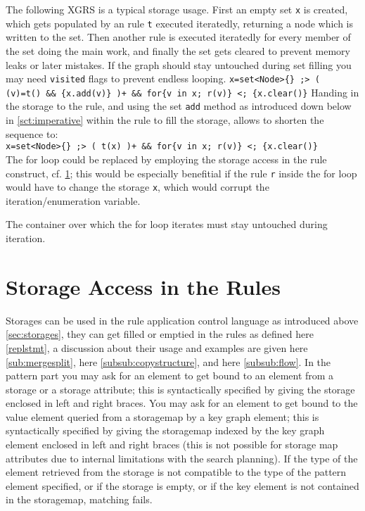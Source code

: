 \begin{example}
The following XGRS is a typical storage usage.
First an empty set \texttt{x} is created, which gets populated by an rule \texttt{t} executed iteratedly, returning a node which is written to the set.
Then another rule is executed iteratedly for every member of the set doing the main work, and finally the set gets cleared to prevent memory leaks or later mistakes.
If the graph should stay untouched during set filling you may need \texttt{visited} flags to prevent endless looping.
\verb#x=set<Node>{} ;> ( (v)=t() && {x.add(v)} )+ && for{v in x; r(v)} <; {x.clear()}#
Handing in the storage to the rule, and using the set \texttt{add} method as introduced down below in \ref{sct:imperative} within the rule to fill the storage, allows to shorten the sequence to:\\
\verb#x=set<Node>{} ;> ( t(x) )+ && for{v in x; r(v)} <; {x.clear()}#\\
The for loop could be replaced by employing the storage access in the rule construct, cf. \ref{sub:storageaccess}; this would be especially benefitial if the rule \texttt{r} inside the for loop would have to change the storage \texttt{x}, which would corrupt the iteration/enumeration variable.
\end{example}

\begin{warning}
The container over which the for loop iterates must stay untouched during iteration.
\end{warning}


\section{Storage Access in the Rules} \label{sub:storageaccess}

Storages can be used in the rule application control language as introduced above \ref{sec:storages}, they can get filled or emptied in the rules as defined here \ref{replstmt}, a discussion about their usage and examples are given here \ref{sub:mergesplit}, here \ref{subsub:copystructure}, and here \ref{subsub:flow}.
In the pattern part you may ask for an element to get bound to an element from a storage or a storage attribute;
this is syntactically specified by giving the storage enclosed in left and right braces.
You may ask for an element to get bound to the value element queried from a storagemap by a key graph element;
this is syntactically specified by giving the storagemap indexed by the key graph element enclosed in left and right braces
(this is not possible for storage map attributes due to internal limitations with the search planning).
If the type of the element retrieved from the storage is not compatible to the type of the pattern element specified,
or if the storage is empty, or if the key element is not contained in the storagemap, matching fails.

